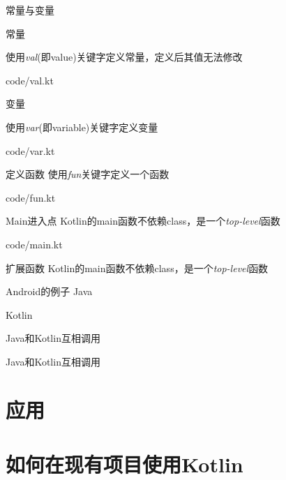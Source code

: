 \documentclass[xcolor={dvipsnames}]{beamer}
\begin{document}
\begin{frame}[fragile]{常量与变量}
  \begin{block}{常量}

    使用\emph{val}(即value)关键字定义常量，定义后其值无法修改
    \begin{lstinputlisting}[language=Kotlin]{code/val.kt}
    \end{lstinputlisting}
  \end{block}

  \begin{block}{变量}

  使用\emph{var}(即variable)关键字定义变量
  \begin{lstinputlisting}[language=Kotlin]{code/var.kt}
  \end{lstinputlisting}
  \end{block}
\end{frame}

\begin{frame}{定义函数}
  使用\emph{fun}关键字定义一个函数
  \begin{lstinputlisting}[language=Kotlin]{code/fun.kt}
  \end{lstinputlisting}
\end{frame}

\begin{frame}{Main进入点}
  Kotlin的main函数不依赖class，是一个\emph{top-level}函数
  \begin{lstinputlisting}[language=Kotlin]{code/main.kt}
  \end{lstinputlisting}
\end{frame}

\begin{frame}{扩展函数}
  Kotlin的main函数不依赖class，是一个\emph{top-level}函数
  
\end{frame}

\begin{frame}{Android的例子}
  \alert{Java}
  
  \alert{Kotlin}
  
\end{frame}

\begin{frame}{Java和Kotlin互相调用}
  
\end{frame}

\begin{frame}{Java和Kotlin互相调用}
  
\end{frame}


\section{应用} %
\begin{frame}
\end{frame}

\section{如何在现有项目使用Kotlin}
\end{document}

